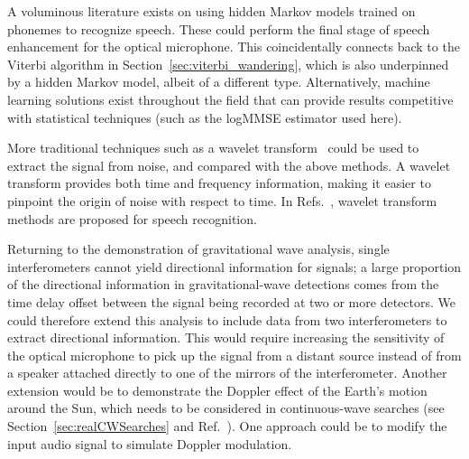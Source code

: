 \documentclass[paper-main.tex]{subfiles}
\begin{document}
A voluminous literature exists on using hidden Markov models trained on phonemes to recognize speech.\cite{HMM_english}
These could perform the final stage of speech enhancement for the optical microphone. 
This coincidentally connects back to the Viterbi algorithm in Section~\ref{sec:viterbi_wandering}, which is also underpinned by a hidden Markov model, albeit of a different type. 
Alternatively, machine learning solutions exist throughout the field that can provide results competitive with statistical techniques (such as the logMMSE estimator used here).\cite{SEGAN}


More traditional techniques such as a wavelet transform~\citep{nason1995stationary} could be used to extract the signal from noise, and compared with the above methods. 
A wavelet transform provides both time and frequency information, making it easier to pinpoint the origin of noise with respect to time. 
In Refs.~\cite{tufekci2000feature,agbinya1996discrete}, wavelet transform methods are proposed for speech recognition. 


Returning to the demonstration of gravitational wave analysis, single interferometers cannot yield directional information for signals; a large proportion of the directional information in gravitational-wave detections comes from the time delay offset between the signal being recorded at two or more detectors.\cite{GW150914}
We could therefore extend this analysis to include data from two interferometers to extract directional information.
This would require increasing the sensitivity of the optical microphone to pick up the signal from a distant source instead of from a speaker attached directly to one of the mirrors of the interferometer.
Another extension would be to demonstrate the Doppler effect of the Earth's motion around the Sun, which needs to be considered in continuous-wave searches (see Section~\ref{sec:realCWSearches} and Ref.~\cite{JKS:1998}). 
One approach could be to modify the input audio signal to simulate Doppler modulation. 
\end{document}
